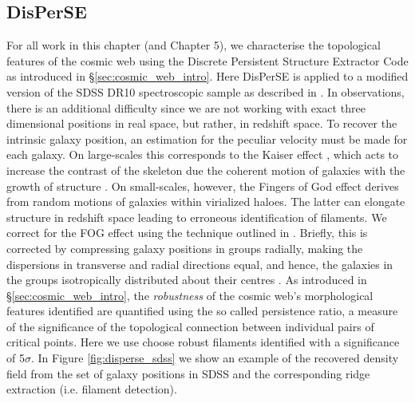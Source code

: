 \subsection{DisPerSE} \label{sec:disperse_sdss}
For all work in this chapter (and Chapter 5), we characterise the topological features of the cosmic web using the Discrete Persistent Structure Extractor Code \citep{sousbie2011a, sousbie2011b} as introduced in \S\ref{sec:cosmic_web_intro}. Here DisPerSE is applied to a modified version of the SDSS DR10 spectroscopic sample as described in \citet{tempel2014}. In observations, there is an additional difficulty since we are not working with exact three dimensional positions in real space, but rather, in redshift space. To recover the intrinsic galaxy position, an estimation for the peculiar velocity must be made for each galaxy. On large-scales this corresponds to the Kaiser effect \citep{kaiser1987}, which acts to increase the contrast of the skeleton due the coherent motion of galaxies with the growth of structure \citep[e.g.][]{shi2016}. On small-scales, however, the Fingers of God effect \citep[FOG;][]{jackson1972,tulley1978} derives from random motions of galaxies within virialized haloes. The latter can elongate structure in redshift space leading to erroneous identification of filaments. We correct for the FOG effect using the technique outlined in \citet{kraljic2018}. Briefly, this is corrected by compressing galaxy positions in groups radially, making the dispersions in transverse and radial directions equal, and hence, the galaxies in the groups isotropically distributed about their centres \citep[e.g. see][]{tegmark2004}. As introduced in \S\ref{sec:cosmic_web_intro}, the \textit{robustness} of the cosmic web's morphological features identified are quantified using the so called persistence ratio, a measure of the significance of the topological connection between individual pairs of critical points. Here we use choose robust filaments identified with a significance of 5$\sigma$. In Figure \ref{fig:disperse_sdss} we show an example of the recovered density field from the set of galaxy positions in SDSS and the corresponding ridge extraction (i.e. filament detection).

